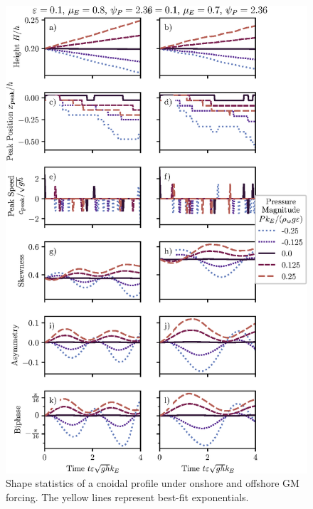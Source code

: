 \documentclass{jfm}
\begin{document}
\begin{figure}
  \centering
  \includegraphics{Skew-Asymm-Cnoidal-GM.eps}
  \caption{
    Shape statistics of a cnoidal profile under onshore and offshore
    GM forcing. The yellow lines represent best-fit exponentials.
  }
\end{figure}
\end{document}
